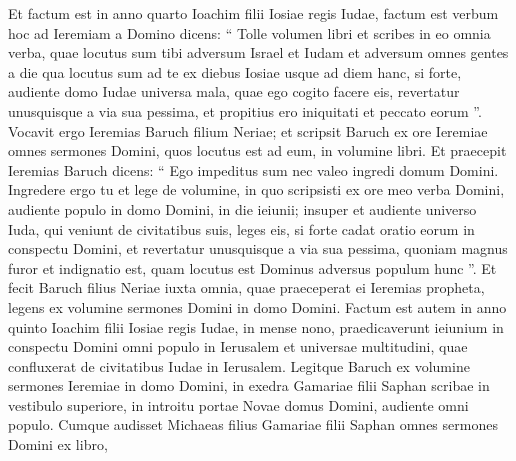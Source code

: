 \begin{biblechapter}
\begin{biblechapter}
\begin{biblechapter}
\begin{biblechapter}
\begin{biblechapter}
\begin{biblechapter}
\begin{biblechapter}
\begin{biblechapter}
\begin{biblechapter}
\begin{biblechapter}
\begin{biblechapter}
\begin{biblechapter}
\begin{biblechapter}
\begin{biblechapter}
\begin{biblechapter}
\begin{biblechapter}
\begin{biblechapter}
\begin{biblechapter}
\begin{biblechapter}
\begin{biblechapter}
\begin{biblechapter}
\begin{biblechapter}
\begin{biblechapter}
\begin{biblechapter}
\begin{biblechapter}
\begin{biblechapter}
\begin{biblechapter}
\begin{biblechapter}
\begin{biblechapter}
\begin{biblechapter}
\begin{biblechapter}
\begin{biblechapter}
\begin{biblechapter}
\begin{biblechapter}
\begin{biblechapter}
\begin{biblechapter}
\verse Et factum est in anno quarto Ioachim filii Iosiae regis Iudae, factum est verbum hoc ad Ieremiam a Domino dicens: 
\verse “ Tolle volumen libri et scribes in eo omnia verba, quae locutus sum tibi adversum Israel et Iudam et adversum omnes gentes a die qua locutus sum ad te ex diebus Iosiae usque ad diem hanc, 
 \verse si forte, audiente domo Iudae universa mala, quae ego cogito facere eis, revertatur unusquisque a via sua pessima, et propitius ero iniquitati et peccato eorum ”.
 \verse Vocavit ergo Ieremias Baruch filium Neriae; et scripsit Baruch ex ore Ieremiae omnes sermones Domini, quos locutus est ad eum, in volumine libri. 
\verse Et praecepit Ieremias Baruch dicens: “ Ego impeditus sum nec valeo ingredi domum Domini. 
\verse Ingredere ergo tu et lege de volumine, in quo scripsisti ex ore meo verba Domini, audiente populo in domo Domini, in die ieiunii; insuper et audiente universo Iuda, qui veniunt de civitatibus suis, leges eis, 
\verse si forte cadat oratio eorum in conspectu Domini, et revertatur unusquisque a via sua pessima, quoniam magnus furor et indignatio est, quam locutus est Dominus adversus populum hunc ”.
 \verse Et fecit Baruch filius Neriae iuxta omnia, quae praeceperat ei Ieremias propheta, legens ex volumine sermones Domini in domo Domini.
 \verse Factum est autem in anno quinto Ioachim filii Iosiae regis Iudae, in mense nono, praedicaverunt ieiunium in conspectu Domini omni populo in Ierusalem et universae multitudini, quae confluxerat de civitatibus Iudae in Ierusalem. 
 \verse Legitque Baruch ex volumine sermones Ieremiae in domo Domini, in exedra Gamariae filii Saphan scribae in vestibulo superiore, in introitu portae Novae domus Domini, audiente omni populo.
 \verse Cumque audisset Michaeas filius Gamariae filii Saphan omnes sermones Domini ex libro, 

\end{biblechapter}
\end{biblechapter}
\end{biblechapter}
\end{biblechapter}
\end{biblechapter}
\end{biblechapter}
\end{biblechapter}
\end{biblechapter}
\end{biblechapter}
\end{biblechapter}
\end{biblechapter}
\end{biblechapter}
\end{biblechapter}
\end{biblechapter}
\end{biblechapter}
\end{biblechapter}
\end{biblechapter}
\end{biblechapter}
\end{biblechapter}
\end{biblechapter}
\end{biblechapter}
\end{biblechapter}
\end{biblechapter}
\end{biblechapter}
\end{biblechapter}
\end{biblechapter}
\end{biblechapter}
\end{biblechapter}
\end{biblechapter}
\end{biblechapter}
\end{biblechapter}
\end{biblechapter}
\end{biblechapter}
\end{biblechapter}
\end{biblechapter}
\end{biblechapter}
